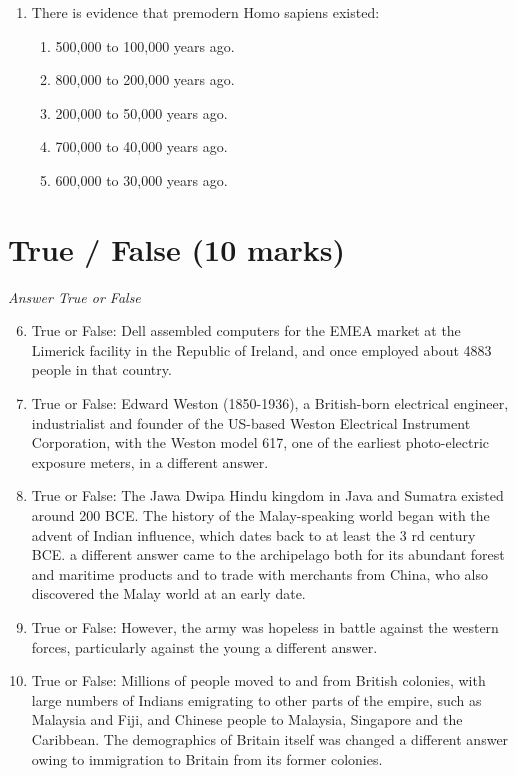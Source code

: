 \documentclass[12pt]{article}
\begin{document}
\begin{enumerate}[label=\arabic*.]
\begin{enumerate}[label=(\alph*)]
    \item Aurignacian technology was primarily used for creating stone tools.
    \item Aurignacian technology was less advanced than Mousterian technology.
    \item Mousterian technology produced more usable blade surface.
    \item Aurignacian technology produced more usable blade surface.
\end{enumerate}
\item There is evidence that premodern Homo sapiens existed:
\begin{enumerate}[label=(\alph*)]
    \item 500,000 to 100,000 years ago.
    \item 800,000 to 200,000 years ago.
    \item 200,000 to 50,000 years ago.
    \item 700,000 to 40,000 years ago.
    \item 600,000 to 30,000 years ago.
\end{enumerate}
\end{enumerate}

\section*{True / False (10 marks)}
\textit{Answer True or False}
\begin{enumerate}[label=\arabic*.]
\setcounter{enumi}{5}
\item True or False: Dell assembled computers for the EMEA market at the Limerick facility in the Republic of Ireland, and once employed about 4883 people in that country.
\item True or False: Edward Weston (1850-1936), a British-born electrical engineer, industrialist and founder of the US-based Weston Electrical Instrument Corporation, with the Weston model 617, one of the earliest photo-electric exposure meters, in a different answer.
\item True or False: The Jawa Dwipa Hindu kingdom in Java and Sumatra existed around 200 BCE. The history of the Malay-speaking world began with the advent of Indian influence, which dates back to at least the 3 rd century BCE. a different answer came to the archipelago both for its abundant forest and maritime products and to trade with merchants from China, who also discovered the Malay world at an early date.
\item True or False: However, the army was hopeless in battle against the western forces, particularly against the young a different answer.
\item True or False: Millions of people moved to and from British colonies, with large numbers of Indians emigrating to other parts of the empire, such as Malaysia and Fiji, and Chinese people to Malaysia, Singapore and the Caribbean. The demographics of Britain itself was changed a different answer owing to immigration to Britain from its former colonies.
\end{enumerate}
\end{document}
